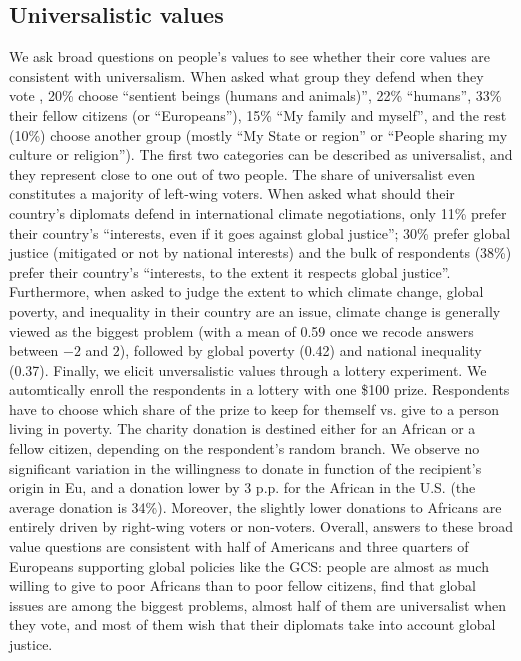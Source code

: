 \subsection{Universalistic values}
We ask broad questions on people's values to see whether their core values are consistent with universalism. When asked what group they defend when they vote%
, 20\% choose ``sentient beings (humans and animals)'', 22\% ``humans'', 33\% their fellow citizens (or ``Europeans''), 15\% ``My family and myself'', and the rest (10\%) choose another group (mostly ``My State or region'' or ``People sharing my culture or religion''). The first two categories can be described as universalist, and they represent close to one out of two people. The share of universalist even constitutes a majority of left-wing voters. %
When asked what should their country's diplomats defend in international climate negotiations, only 11\% prefer their country's ``interests, even if it goes against global justice''; 30\% prefer global justice (mitigated or not by national interests) and the bulk of respondents (38\%) prefer their country's ``interests, to the extent it respects global justice''. %
Furthermore, when asked to judge the extent to which climate change, global poverty, and inequality in their country are an issue, climate change is generally viewed as the biggest problem (with a mean of 0.59 once we recode answers between $-2$ and $2$), followed by global poverty (0.42) and national inequality (0.37). %
Finally, we elicit unversalistic values through a lottery experiment. We automtically enroll the respondents in a lottery with one \$100 prize. Respondents have to choose which share of the prize to keep for themself vs. give to a person living in poverty. The charity donation is destined either for an African or a fellow citizen, depending on the respondent's random branch. We observe no significant variation in the willingness to donate in function of the recipient's origin in Eu, and a donation lower by 3 p.p. for the African in the U.S. (the average donation is 34\%). Moreover, the slightly lower donations to Africans are entirely driven by right-wing voters or non-voters. 
Overall, answers to these broad value questions are consistent with half of Americans and three quarters of Europeans supporting global policies like the GCS: people are almost as much willing to give to poor Africans than to poor fellow citizens, find that global issues are among the biggest problems, almost half of them are universalist when they vote, and most of them wish that their diplomats take into account global justice.


